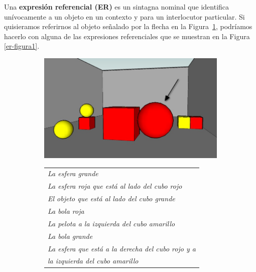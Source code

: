 Una {\bf expresi\'on referencial (ER)} es un sintagna nominal que identifica un\'ivocamente a un objeto en un contexto y para un interlocutor particular. Si quisieramos referirnos al objeto se\~nalado por la flecha en la Figura~\ref{GRE3D7-stimulus1}, podr\'iamos hacerlo con alguna de las expresiones referenciales que se muestran en la Figura \ref{er-figura1}.
\begin{figure}[H]
\begin{subfigure}{.5\textwidth}
  \centering
\includegraphics[width=\textwidth]{images/22sinletras.jpg}
  \caption{}\label{GRE3D7-stimulus1}
\end{subfigure}%
\begin{subfigure}{.5\textwidth}
 \centering

\begin{tabular}{l}
 {\it La esfera grande}\\

 {\it La esfera roja que est\'a al lado del cubo rojo} \\

 {\it El objeto que est\'a al lado del cubo grande}\\

 {\it La bola roja}\\

 {\it La pelota a la izquierda del cubo amarillo}\\

 {\it La bola grande}\\

 {\it La esfera que est\'a a la derecha del cubo rojo y a }\\
{\it la izquierda del cubo amarillo}\\


\end{tabular}
\end{subfigure}
\end{figure}
